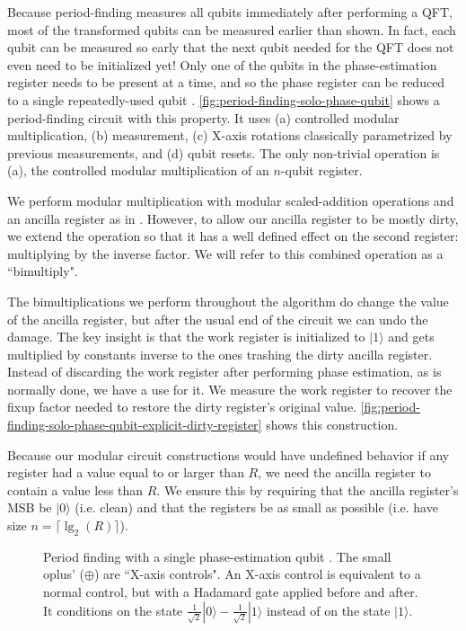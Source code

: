 \documentclass[twocolumn,longbibliography]{quantumarticle-customized}
\begin{document}
Because period-finding measures all qubits immediately after performing a QFT, most of the transformed qubits can be measured earlier than shown.
In fact, each qubit can be measured so early that the next qubit needed for the QFT does not even need to be initialized yet!
Only one of the qubits in the phase-estimation register needs to be present at a time, and so the phase register can be reduced to a single repeatedly-used qubit \cite{zalka1998, mosca1999, parker2000, beauregard2003}.
\autoref{fig:period-finding-solo-phase-qubit} shows a period-finding circuit with this property.
It uses (a) controlled modular multiplication, (b) measurement, (c) X-axis rotations classically parametrized by previous measurements, and (d) qubit resets.
The only non-trivial operation is (a), the controlled modular multiplication of an $n$-qubit register.

We perform modular multiplication with modular scaled-addition operations and an ancilla register as in \cite{beauregard2003}.
However, to allow our ancilla register to be mostly dirty, we extend the operation so that it has a well defined effect on the second register: multiplying by the inverse factor.
We will refer to this combined operation as a ``bimultiply".

The bimultiplications we perform throughout the algorithm do change the value of the ancilla register, but after the usual end of the circuit we can undo the damage.
The key insight is that the work register is initialized to $|1\rangle$ and gets multiplied by constants inverse to the ones trashing the dirty ancilla register.
Instead of discarding the work register after performing phase estimation, as is normally done, we have a use for it.
We measure the work register to recover the fixup factor needed to restore the dirty register's original value.
\autoref{fig:period-finding-solo-phase-qubit-explicit-dirty-register} shows this construction.

Because our modular circuit constructions would have undefined behavior if any register had a value equal to or larger than $R$, we need the ancilla register to contain a value less than $R$.
We ensure this by requiring that the ancilla register's MSB be $|0\rangle$ (i.e. clean) and that the registers be as small as possible (i.e. have size $n = \lceil \lg_2(R) \rceil$).

\begin{figure}
  \centering
  \caption{
	Period finding with a single phase-estimation qubit \cite{beauregard2003}.
	The small oplus' ({\tiny $\oplus$}) are ``X-axis controls".
	An X-axis control is equivalent to a normal control, but with a Hadamard gate applied before and after.
	It conditions on the state $\frac{1}{\sqrt 2}|0\rangle - \frac{1}{\sqrt 2}|1\rangle$ instead of on the state $|1\rangle$.
  }
  \label{fig:period-finding-solo-phase-qubit}
\end{figure}
\end{document}

